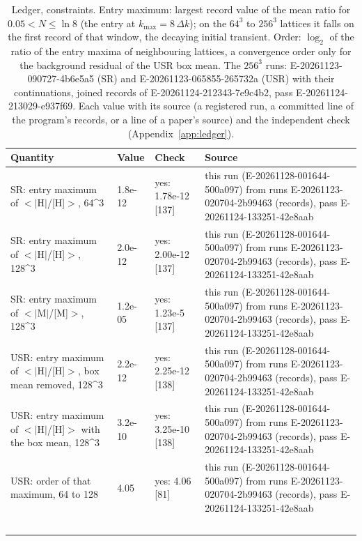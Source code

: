 \begin{table}
\caption{Ledger, constraints. Entry maximum: largest record value of the mean ratio for $0.05 < N \le \ln 8$ (the entry at $k_\mathrm{max} = 8\,\Delta k$); on the $64^3$ to $256^3$ lattices it falls on the first record of that window, the decaying initial transient. Order: $\log_2$ of the ratio of the entry maxima of neighbouring lattices, a convergence order only for the background residual of the USR box mean. The $256^3$ runs: E-20261123-090727-4b6e5a5 (SR) and E-20261123-065855-265732a (USR) with their continuations, joined records of E-20261124-212343-7e9c4b2, pass E-20261124-213029-e937f69. Each value with its source (a registered run, a committed line of the program's records, or a line of a paper's source) and the independent check (Appendix~\ref{app:ledger}).}
\label{tab:ledgerconstraints}
\footnotesize
\begin{tabular}{p{}p{}p{}p{}}
\toprule
Quantity & Value & Check & Source \\
\midrule
SR: entry maximum of $<$$|$H$|$/\allowbreak{}[H]$>$, 64\^{}3 & 1.8e-12 & yes: 1.78e-12 [137] & this run (E-20261128-001644-500a097) from runs E-20261123-020704-2b99463 (records), pass E-20261124-133251-42e8aab \\
SR: entry maximum of $<$$|$H$|$/\allowbreak{}[H]$>$, 128\^{}3 & 2.0e-12 & yes: 2.00e-12 [137] & this run (E-20261128-001644-500a097) from runs E-20261123-020704-2b99463 (records), pass E-20261124-133251-42e8aab \\
SR: entry maximum of $<$$|$M$|$/\allowbreak{}[M]$>$, 128\^{}3 & 1.2e-05 & yes: 1.23e-5 [137] & this run (E-20261128-001644-500a097) from runs E-20261123-020704-2b99463 (records), pass E-20261124-133251-42e8aab \\
USR: entry maximum of $<$$|$H$|$/\allowbreak{}[H]$>$, box mean removed, 128\^{}3 & 2.2e-12 & yes: 2.25e-12 [138] & this run (E-20261128-001644-500a097) from runs E-20261123-020704-2b99463 (records), pass E-20261124-133251-42e8aab \\
USR: entry maximum of $<$$|$H$|$/\allowbreak{}[H]$>$ with the box mean, 128\^{}3 & 3.2e-10 & yes: 3.25e-10 [138] & this run (E-20261128-001644-500a097) from runs E-20261123-020704-2b99463 (records), pass E-20261124-133251-42e8aab \\
USR: order of that maximum, 64 to 128 & 4.05 & yes: 4.06 [81] & this run (E-20261128-001644-500a097) from runs E-20261123-020704-2b99463 (records), pass E-20261124-133251-42e8aab \\
$$
\end{tabular}
\end{table}
